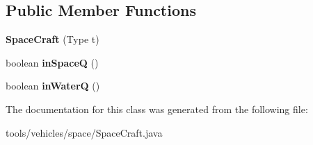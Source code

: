 \subsection*{Public Member Functions}
\begin{DoxyCompactItemize}
\item 
{\bfseries Space\+Craft} (Type t)\hypertarget{classtools_1_1vehicles_1_1space_1_1_space_craft_a2a6385ba22bf3a3d6ae120e4c3454a89}{}\label{classtools_1_1vehicles_1_1space_1_1_space_craft_a2a6385ba22bf3a3d6ae120e4c3454a89}

\item 
boolean {\bfseries in\+SpaceQ} ()\hypertarget{classtools_1_1vehicles_1_1space_1_1_space_craft_a9fb50840b623b449c08e57b75d22351f}{}\label{classtools_1_1vehicles_1_1space_1_1_space_craft_a9fb50840b623b449c08e57b75d22351f}

\item 
boolean {\bfseries in\+WaterQ} ()\hypertarget{classtools_1_1vehicles_1_1space_1_1_space_craft_a1961ff4e3e50afb7fbc8cc1d1979c04f}{}\label{classtools_1_1vehicles_1_1space_1_1_space_craft_a1961ff4e3e50afb7fbc8cc1d1979c04f}

\end{DoxyCompactItemize}


The documentation for this class was generated from the following file\+:\begin{DoxyCompactItemize}
\item 
tools/vehicles/space/Space\+Craft.\+java\end{DoxyCompactItemize}
